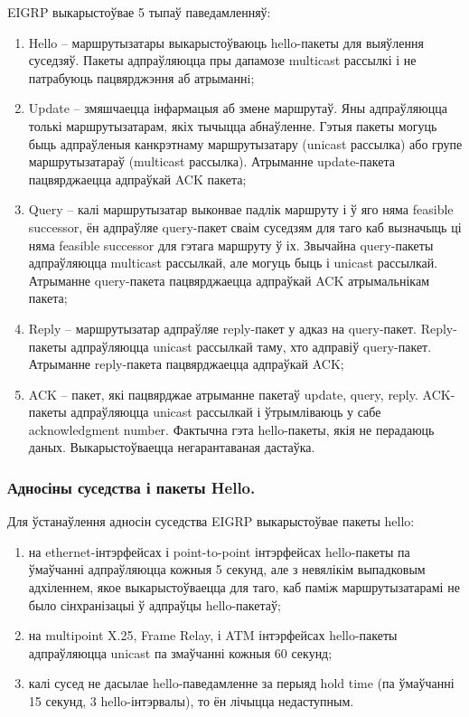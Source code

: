 EIGRP выкарыстоўвае 5 тыпаў паведамленняў:
\begin{enumerate}
    \item Hello -- маршрутызатары выкарыстоўваюць hello-пакеты для выяўлення суседзяў. Пакеты адпраўляюцца пры дапамозе multicast рассылкі і не патрабуюць пацвярджэння аб атрыманнi;
    \item Update -- змяшчаецца інфармацыя аб змене маршрутаў. Яны адпраўляюцца толькі маршрутызатарам, якіх тычыцца абнаўленне. Гэтыя пакеты могуць быць адпраўленыя канкрэтнаму маршрутызатару (unicast рассылка) або групе маршрутызатараў (multicast рассылка). Атрыманне update-пакета пацвярджаецца адпраўкай ACK пакета;
    \item Query -- калі маршрутызатар выконвае падлік маршруту і ў яго няма feasible successor, ён адпраўляе query-пакет сваім суседзям для таго каб вызначыць ці няма feasible successor для гэтага маршруту ў іх. Звычайна query-пакеты адпраўляюцца multicast рассылкай, але могуць быць і unicast рассылкай. Атрыманне query-пакета пацвярджаецца адпраўкай ACK атрымальнікам пакета;
    \item Reply -- маршрутызатар адпраўляе reply-пакет у адказ на query-пакет. Reply-пакеты адпраўляюцца unicast рассылкай таму, хто адправіў query-пакет. Атрыманне reply-пакета пацвярджаецца адпраўкай ACK;
    \item ACK -- пакет, які пацвярджае атрыманне пакетаў update, query, reply. ACK-пакеты адпраўляюцца unicast рассылкай і ўтрымліваюць у сабе acknowledgment number. Фактычна гэта hello-пакеты, якія не перадаюць даных. Выкарыстоўваецца негарантаваная дастаўка.
\end{enumerate}

\subsubsection{Адносіны суседства і пакеты Hello.}

Для ўстанаўлення адносін суседства EIGRP выкарыстоўвае пакеты hello:
\begin{enumerate}
    \item на ethernet-інтэрфейсах і point-to-point інтэрфейсах hello-пакеты па ўмаўчанні адпраўляюцца кожныя 5 секунд, але з невялікім выпадковым адхіленнем, якое выкарыстоўваецца для таго, каб паміж маршрутызатарамі не было сінхранізацыі ў адпраўцы hello-пакетаў;
    \item на multipoint X.25, Frame Relay, і ATM інтэрфейсах hello-пакеты адпраўляюцца unicast па змаўчанні кожныя 60 секунд;
    \item калі сусед не дасылае hello-паведамленне за перыяд hold time (па ўмаўчанні 15 секунд, 3 hello-інтэрвалы), то ён лічыцца недаступным.
\end{enumerate}

